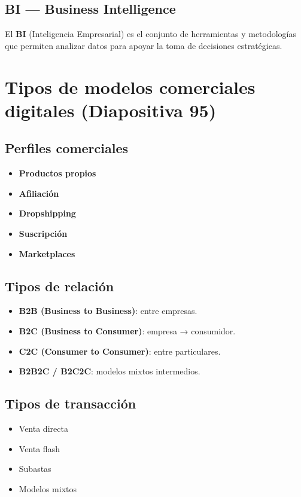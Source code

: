 \documentclass[11pt,a4paper]{article}
\begin{document}
\subsection{BI — Business Intelligence}
\begin{DefBox}
El \textbf{BI} (Inteligencia Empresarial) es el conjunto de herramientas y metodologías que permiten analizar datos para apoyar la toma de decisiones estratégicas.
\end{DefBox}

\section{Tipos de modelos comerciales digitales (Diapositiva 95)}

\subsection{Perfiles comerciales}
\begin{itemize}
	\item \textbf{Productos propios}
	\item \textbf{Afiliación}
	\item \textbf{Dropshipping}
	\item \textbf{Suscripción}
	\item \textbf{Marketplaces}
\end{itemize}

\subsection{Tipos de relación}
\begin{itemize}
	\item \textbf{B2B (Business to Business)}: entre empresas.
	\item \textbf{B2C (Business to Consumer)}: empresa → consumidor.
	\item \textbf{C2C (Consumer to Consumer)}: entre particulares.
	\item \textbf{B2B2C / B2C2C}: modelos mixtos intermedios.
\end{itemize}

\subsection{Tipos de transacción}
\begin{itemize}
	\item Venta directa
	\item Venta flash
	\item Subastas
	\item Modelos mixtos
\end{itemize}
\end{document}
